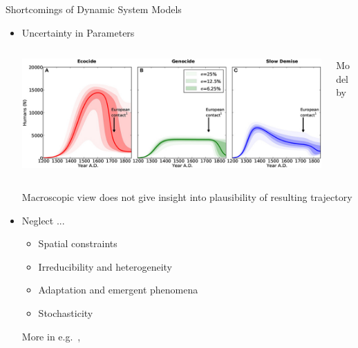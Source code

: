 \begin{frame}{Shortcomings of Dynamic System Models}
\begin{itemize}
\item Uncertainty in Parameters\\ \vspace{0.3cm}
{\centering 
	\begin{columns}
		\begin{column}{0.7\textwidth}
			\includegraphics[width=\textwidth]{images/Brandt2015_onlyHumans}
		\end{column}
		\begin{column}{0.15\textwidth}
			{\footnotesize Model by \citet{Brandt2015}}
		\end{column}
	\end{columns}
} \vspace{0.3cm}
\ra Macroscopic view does not give insight into plausibility of resulting trajectory
\pause\item Neglect ...
\begin{itemize}
\item Spatial constraints
\item Irreducibility and heterogeneity
\item Adaptation and emergent phenomena
\item Stochasticity
\end{itemize} 
\vfill 
{\tiny More in e.g.\ \citet{Bookstaber2019}, \citet{Bonabeau2002}}
\end{itemize}
\end{frame}

